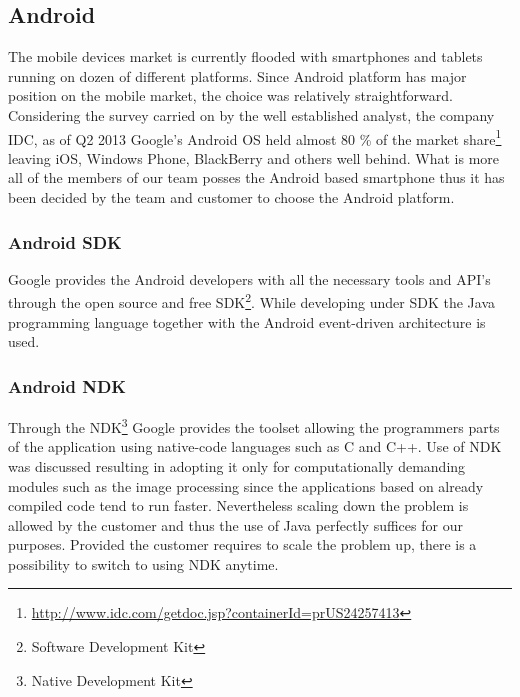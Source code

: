 
\subsection{Android} \label{subsec:mobile_platform}

The mobile devices market is currently flooded with smartphones and tablets running on dozen of different platforms. 
Since Android platform has major position on the mobile market, the choice was relatively straightforward.
Considering the survey carried on by the well established analyst, the company IDC, as of Q2 2013 Google's Android OS held almost 80 \% of the market share\footnote{\url{http://www.idc.com/getdoc.jsp?containerId=prUS24257413}} leaving iOS, Windows Phone, BlackBerry and others well behind.
What is more all of the members of our team posses the Android based smartphone thus it has been decided by the team and customer to choose the Android platform.

\subsubsection{Android SDK}

Google provides the Android developers with all the necessary tools and API's through the open source and free SDK\footnote{Software Development Kit}. While developing under SDK the Java programming language together with the Android event-driven architecture is used.

\subsubsection{Android NDK}

Through the NDK\footnote{Native Development Kit} Google provides the toolset allowing the programmers parts of the application using native-code languages such as C and C++.
Use of NDK was discussed resulting in adopting it only for computationally demanding modules such as the image processing since the applications based on already compiled code tend to run faster.
Nevertheless scaling down the problem is allowed by the customer and thus the use of Java perfectly suffices for our purposes.
Provided the customer requires to scale the problem up, there is a possibility to switch to using NDK anytime.


